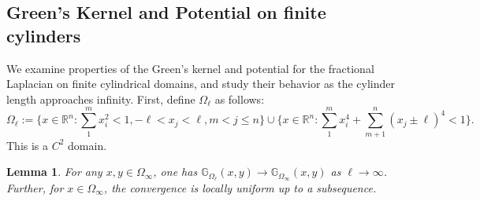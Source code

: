 \documentclass{amsart}
\newtheorem{lemma}[theorem]{Lemma}
\newcommand{\rn}{\mathbb{R}^{n}}
\newcommand{\gk}[1]{\mathbb{G}_{#1}}
\begin{document}
\subsection{Green's Kernel and Potential on finite cylinders}
We examine properties of the Green’s kernel and potential for the fractional Laplacian on finite cylindrical domains, and study their behavior as the cylinder length approaches infinity. First, define  $\Omega_{\ell}$ as follows:
\begin{equation}\label{dfn of omegaell}
    \Omega_{\ell}:=\{x\in\rn:\sum_{1}^{m}x_{i}^{2}<1, -\ell<x_{j}<\ell, m<j\leq n \}\cup\{x\in\rn:\sum_{1}^{m}x_{i}^{4}+\sum_{m+1}^{n}(x_{j}\pm \ell)^{4}<1\}.
\end{equation}
This is a $C^{2}$ domain.
\begin{lemma}\label{lemma convergence of greens kernel}
  For any $x,y \in\Omega_{\infty}$, one has $\gk{\Omega_{\ell}}(x,y)\to \gk{\Omega_{\infty}}(x,y)$ as $\ell \to \infty$. Further, for $x\in \Omega_{\infty}$, the convergence is locally uniform up to a subsequence.
\end{lemma}
\end{document}
